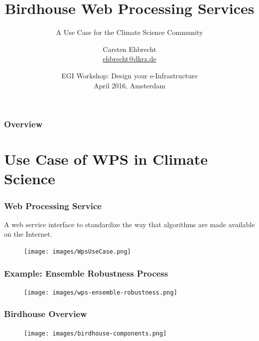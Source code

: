 \documentclass{beamer}
\title[Birdhouse]
{Birdhouse Web Processing Services}
\subtitle{A Use Case for the Climate Science Community}
\author{
Carsten Ehbrecht\\
\medskip
{\scriptsize \url{ehbrecht@dkrz.de}}
}
\institute{German Climate Computing Center (DKRZ)}
\date[April 2016]
{EGI Workshop: Design your e-Infrastructure\\
April 2016, Amsterdam}
\begin{document}

  \begin{frame}[plain]
    \titlepage
  \end{frame}


\begin{frame}
\frametitle{Overview} %
\tableofcontents %
\end{frame}


  \section{Use Case of WPS in Climate Science}


  \begin{frame}[plain]
    \frametitle{Web Processing Service}
    A web service interface to standardize the way that algorithms are made available on the Internet.
    \begin{figure}
      \texttt{[image: images/WpsUseCase.png]}
    \end{figure}
  \end{frame}


  \begin{frame}[plain]
    \frametitle{Example: Ensemble Robustness Process}
    \begin{figure}
      \texttt{[image: images/wps-ensemble-robustness.png]}
    \end{figure}
   \end{frame}


  \begin{frame}[plain]
    \frametitle{Birdhouse Overview}
    \begin{figure}
      \texttt{[image: images/birdhouse-components.png]}
    \end{figure}
  \end{frame}
\end{document}
